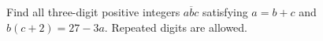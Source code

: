 Find all three-digit positive integers $\overline{abc}$ satisfying $a=b+c$ and $b(c+2)=27-3a$. Repeated digits are allowed.
